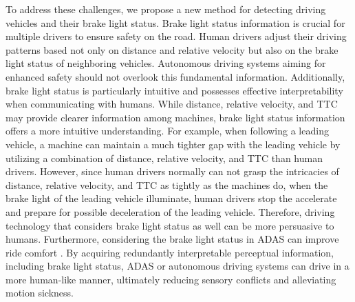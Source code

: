 To address these challenges, we propose a new method for detecting driving vehicles and their brake light status.
Brake light status information is crucial for multiple drivers to ensure safety on the road.
Human drivers adjust their driving patterns based not only on distance and relative velocity but also on the brake light status of neighboring vehicles. 
Autonomous driving systems aiming for enhanced safety should not overlook this fundamental information.
Additionally, brake light status is particularly intuitive and possesses effective interpretability when communicating with humans.
While distance, relative velocity, and TTC may provide clearer information among machines, brake light status information offers a more intuitive understanding.
For example, when following a leading vehicle, a machine can maintain a much tighter gap with the leading vehicle by utilizing a combination of distance, relative velocity, and TTC than human drivers.
However, since human drivers normally can not grasp the intricacies of distance, relative velocity, and TTC as tightly as the machines do, when the brake light of the leading vehicle illuminate, human drivers stop the accelerate and prepare for possible deceleration of the leading vehicle.
Therefore, driving technology that considers brake light status as well can be more persuasive to humans.
Furthermore, considering the brake light status in ADAS can improve ride comfort \cite{pirhonen2022predictive}.
By acquiring redundantly interpretable perceptual information, including brake light status, ADAS or autonomous driving systems can drive in a more human-like manner, ultimately reducing sensory conflicts and alleviating motion sickness.



